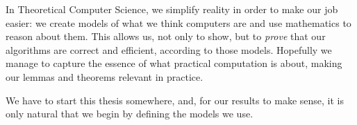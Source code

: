
In Theoretical Computer Science, we simplify reality in order to make our job
easier: we create models of what we think computers are and use mathematics to
reason about them.
%
This allows us, not only to show, but to \emph{prove} that our algorithms are
correct and efficient, according to those models.
%
Hopefully we manage to capture the essence of what practical computation is
about, making our lemmas and theorems relevant in practice.

We have to start this thesis somewhere, and,
for our results to make sense,
it is only natural that we begin by defining the models we
use.



